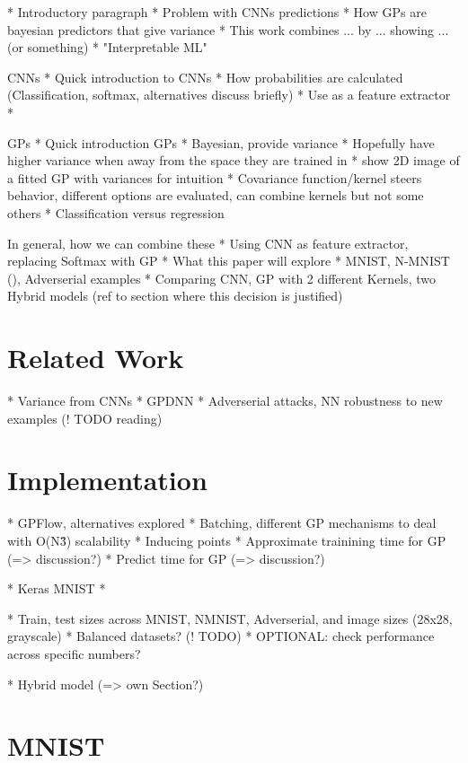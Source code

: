 \documentclass{article}
\begin{document}
* Introductory paragraph
 * Problem with CNNs predictions
 * How GPs are bayesian predictors that give variance
 * This work combines ... by ... showing ... (or something)
 * "Interpretable ML"
 
CNNs
 * Quick introduction to CNNs
 * How probabilities are calculated (Classification, softmax, alternatives discuss briefly)
 * Use as a feature extractor
 * 

GPs
 * Quick introduction GPs
 * Bayesian, provide variance
 * Hopefully have higher variance when away from the space they are trained in
   * show 2D image of a fitted GP with variances for intuition
 * Covariance function/kernel steers behavior, different options are evaluated, can combine kernels but not some others
 * Classification versus regression
  
In general, how we can combine these 
 * Using CNN as feature extractor, replacing Softmax with GP
 * What this paper will explore
 * MNIST, N-MNIST (\cite{basu2017learning}), Adverserial examples
 * Comparing CNN, GP with 2 different Kernels, two Hybrid models (ref to section where this decision is justified)
 



\section{Related Work}

* Variance from CNNs
* GPDNN
* Adverserial attacks, NN robustness to new examples (! TODO reading)

 
\section{Implementation}
* GPFlow, alternatives explored
 * Batching, different GP mechanisms to deal with O(N\^3) scalability
 * Inducing points
 * Approximate trainining time for GP (=> discussion?)
 * Predict time for GP (=> discussion?)

* Keras MNIST
 * 

* Train, test sizes across MNIST, NMNIST, Adverserial, and image sizes (28x28, grayscale)
* Balanced datasets? (! TODO)
* OPTIONAL: check performance across specific numbers?


* Hybrid model (=> own Section?)

\section{MNIST}
\end{document}
